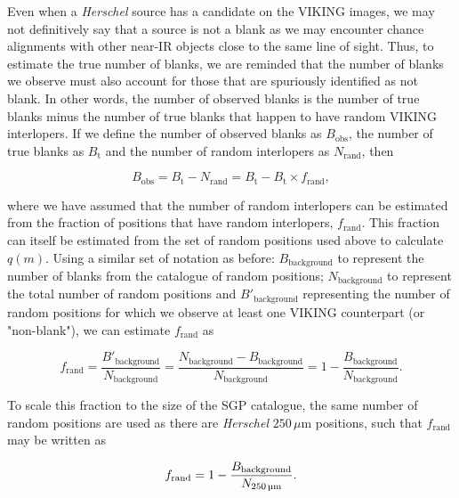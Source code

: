 Even when a \textit{Herschel} source has a candidate on the VIKING images, we may not definitively say that a source is not a blank as we may encounter chance alignments with other near-IR objects close to the same line of sight. Thus, to estimate the true number of blanks, we are reminded that the number of blanks we observe must also account for those that are spuriously identified as not blank. In other words, the number of observed blanks is the number of true blanks minus the number of true blanks that happen to have random VIKING interlopers. If we define the number of observed blanks as $B_{\textrm{obs}}$, the number of true blanks as $B_{\textrm{t}}$ and the number of random interlopers as $N_{\textrm{rand}}$, then

\begin{equation}
    B_{\textrm{obs}} = B_{\textrm{t}} - N_{\textrm{rand}} = B_{\textrm{t}} - B_{\textrm{t}} \times f_{\textrm{rand}},
    \label{eq:observed_blanks}
\end{equation}

\noindent where we have assumed that the number of random interlopers can be estimated from the fraction of positions that have random interlopers, $f_{\textrm{rand}}$. This fraction can itself be estimated from the set of random positions used above to calculate $q(m)$. Using a similar set of notation as before: $B_{\textrm{background}}$ to represent the number of blanks from the catalogue of random positions; $N_{\textrm{background}}$ to represent the total number of random positions and $B'_{\textrm{background}}$ representing the number of random positions for which we observe at least one VIKING counterpart (or "non-blank"), we can estimate $f_{\textrm{rand}}$ as

\begin{equation}
    f_{\textrm{rand}} = \frac{B'_{\textrm{background}}}{N_{\textrm{background}}} = \frac{N_{\textrm{background}} - B_{\textrm{background}}}{N_{\textrm{background}}} = 1 - \frac{B_{\textrm{background}}}{N_{\textrm{background}}}.
\end{equation}

To scale this fraction to the size of the SGP catalogue, the same number of random positions are used as there are \textit{Herschel} $250\,\mu$m positions, such that $f_{\textrm{rand}}$ may be written as

\begin{equation}
    f_{\textrm{rand}} = 1 - \frac{B_{\textrm{background}}}{N_{\textrm{250\,\micron}}}.
\end{equation}

